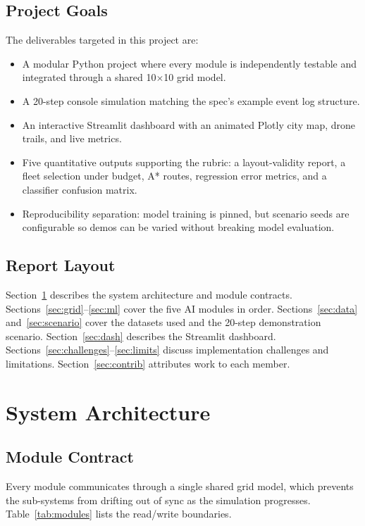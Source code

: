 \documentclass[11pt,a4paper]{article}
\begin{document}
\subsection{Project Goals}
The deliverables targeted in this project are:
\begin{itemize}[leftmargin=*]
  \item A modular Python project where every module is independently
        testable and integrated through a shared 10$\times$10 grid model.
  \item A 20-step console simulation matching the spec's example event
        log structure.
  \item An interactive Streamlit dashboard with an animated Plotly city
        map, drone trails, and live metrics.
  \item Five quantitative outputs supporting the rubric: a layout-validity
        report, a fleet selection under budget, A* routes, regression
        error metrics, and a classifier confusion matrix.
  \item Reproducibility separation: model training is pinned, but
        scenario seeds are configurable so demos can be varied without
        breaking model evaluation.
\end{itemize}

\subsection{Report Layout}
Section~\ref{sec:arch} describes the system architecture and module
contracts. Sections~\ref{sec:grid}--\ref{sec:ml} cover the five AI
modules in order. Sections~\ref{sec:data} and~\ref{sec:scenario} cover
the datasets used and the 20-step demonstration scenario.
Section~\ref{sec:dash} describes the Streamlit dashboard.
Sections~\ref{sec:challenges}--\ref{sec:limits} discuss implementation
challenges and limitations. Section~\ref{sec:contrib} attributes work to
each member.

\section{System Architecture}
\label{sec:arch}

\subsection{Module Contract}
Every module communicates through a single shared grid model, which
prevents the sub-systems from drifting out of sync as the simulation
progresses. Table~\ref{tab:modules} lists the read/write boundaries.
\end{document}
